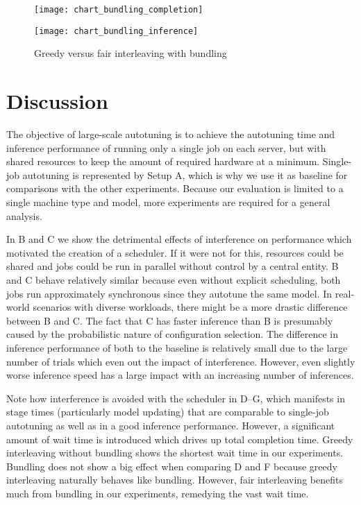 \begin{figure}[t]
	\begin{minipage}[b]{.6\textwidth}
		\centering\texttt{[image: chart\_bundling\_completion]}
		\label{fig:chart-bundling-completion}
	\end{minipage}%
	\hfill
	\begin{minipage}[b]{.35\textwidth}
		\centering\texttt{[image: chart\_bundling\_inference]}
		\label{fig:chart-bundling-inference}
	\end{minipage}
	\caption[Results of greedy versus fair interleaving with bundling]{Greedy versus fair interleaving with bundling}
	\label{fig:chart-bundling}
\end{figure}

\section{Discussion}
The objective of large-scale autotuning is to achieve the autotuning time and inference performance of running only a single job on each server, but with shared resources to keep the amount of required hardware at a minimum. Single-job autotuning is represented by Setup A, which is why we use it as baseline for comparisons with the other experiments. Because our evaluation is limited to a single machine type and model, more experiments are required for a general analysis.

In B and C we show the detrimental effects of interference on performance which motivated the creation of a scheduler. If it were not for this, resources could be shared and jobs could be run in parallel without control by a central entity. B and C behave relatively similar because even without explicit scheduling, both jobs run approximately synchronous since they autotune the same model. In real-world scenarios with diverse workloads, there might be a more drastic difference between B and C. The fact that C has faster inference than B is presumably caused by the probabilistic nature of configuration selection. The difference in inference performance of both to the baseline is relatively small due to the large number of trials which even out the impact of interference. However, even slightly worse inference speed has a large impact with an increasing number of inferences.

Note how interference is avoided with the scheduler in D--G, which manifests in stage times (particularly model updating) that are comparable to single-job autotuning as well as in a good inference performance. However, a significant amount of wait time is introduced which drives up total completion time. Greedy interleaving without bundling shows the shortest wait time in our experiments. Bundling does not show a big effect when comparing D and F because greedy interleaving naturally behaves like bundling. However, fair interleaving benefits much from bundling in our experiments, remedying the vast wait time.

